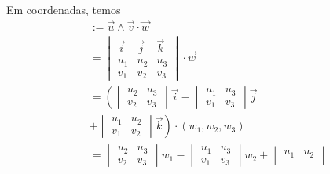 Em coordenadas, temos
\begin{align}
  [\vec{u},\vec{v},\vec{w}] &:= \vec{u}\land\vec{v}\cdot\vec{w} \\
                            &=
                              \begin{vmatrix}
                                \vec{i} & \vec{j} & \vec{k} \\
                                u_1 & u_2 & u_3 \\
                                v_1 & v_2 & v_3
                              \end{vmatrix} \cdot \vec{w} \\
                            &= \left(
                              \begin{vmatrix}
                                u_2 & u_3\\
                                v_2 & v_3
                              \end{vmatrix}\vec{i} -
                                      \begin{vmatrix}
                                        u_1 & u_3 \\
                                        v_1 & v_3
                                      \end{vmatrix}\vec{j} \right.\\
                            &\left. +
                              \begin{vmatrix}
                                u_1 & u_2\\
                                v_1 & v_2
                              \end{vmatrix}\vec{k}\right)\cdot(w_1,w_2,w_3)\\
                            &= \begin{vmatrix}
                                u_2 & u_3\\
                                v_2 & v_3
                              \end{vmatrix}w_1 -
                                      \begin{vmatrix}
                                        u_1 & u_3 \\
                                        v_1 & v_3
                                      \end{vmatrix}w_2
                                              + \begin{vmatrix}
                                                u_1 & u_2\\

\end{vmatrix}
\end{align}
